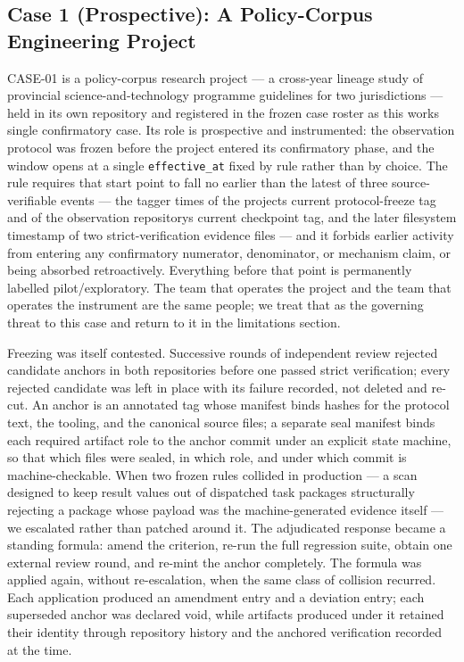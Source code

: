 \documentclass[
  english,
]{article}
\begin{document}
\subsection{Case 1 (Prospective): A Policy-Corpus Engineering Project}\label{case-1-prospective-a-policy-corpus-engineering-project}

CASE-01 is a policy-corpus research project --- a cross-year lineage study of provincial science-and-technology programme guidelines for two jurisdictions --- held in its own repository and registered in the frozen case roster as this work\textquotesingle s single confirmatory case. Its role is prospective and instrumented: the observation protocol was frozen before the project entered its confirmatory phase, and the window opens at a single \texttt{effective\_at} fixed by rule rather than by choice. The rule requires that start point to fall no earlier than the latest of three source-verifiable events --- the tagger times of the project\textquotesingle s current protocol-freeze tag and of the observation repository\textquotesingle s current checkpoint tag, and the later filesystem timestamp of two strict-verification evidence files --- and it forbids earlier activity from entering any confirmatory numerator, denominator, or mechanism claim, or being absorbed retroactively. Everything before that point is permanently labelled pilot/exploratory. The team that operates the project and the team that operates the instrument are the same people; we treat that as the governing threat to this case and return to it in the limitations section.

Freezing was itself contested. Successive rounds of independent review rejected candidate anchors in both repositories before one passed strict verification; every rejected candidate was left in place with its failure recorded, not deleted and re-cut. An anchor is an annotated tag whose manifest binds hashes for the protocol text, the tooling, and the canonical source files; a separate seal manifest binds each required artifact role to the anchor commit under an explicit state machine, so that which files were sealed, in which role, and under which commit is machine-checkable. When two frozen rules collided in production --- a scan designed to keep result values out of dispatched task packages structurally rejecting a package whose payload was the machine-generated evidence itself --- we escalated rather than patched around it. The adjudicated response became a standing formula: amend the criterion, re-run the full regression suite, obtain one external review round, and re-mint the anchor completely. The formula was applied again, without re-escalation, when the same class of collision recurred. Each application produced an amendment entry and a deviation entry; each superseded anchor was declared void, while artifacts produced under it retained their identity through repository history and the anchored verification recorded at the time.
\end{document}
